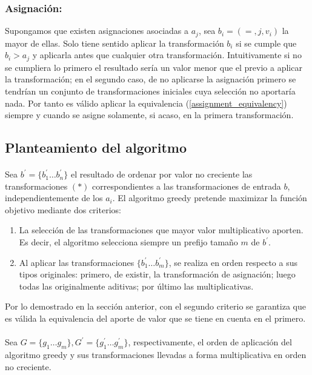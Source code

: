 \documentclass{article}
\theoremstyle{default}
\begin{document}
		\subsubsection{Asignación:}
		\label{assignment_equivalency_proof}
		Supongamos que existen asignaciones asociadas a $a_j$, sea $b_i = (=, j, v_i)$ la mayor de ellas. Solo tiene sentido aplicar la transformación $b_i$ si se cumple que $b_i > a_j$ y aplicarla antes que cualquier otra transformación. Intuitivamente si no se cumpliera lo primero el resultado sería un valor menor que el previo a aplicar la transformación; en el segundo caso, de no aplicarse la asignación primero se tendrían un conjunto de transformaciones iniciales cuya selección no aportaría nada. Por tanto es válido aplicar la equivalencia (\ref{assignment_equivalency}) siempre y cuando se asigne solamente, si acaso, en la primera transformación.
%
\subsection{Planteamiento del algoritmo}
\paragraph{}
	Sea $b^\prime = \{b_1^\prime \dots b_n^\prime\}$ el resultado de ordenar por valor no creciente las transformaciones $(*)$ correspondientes a las transformaciones de entrada $b$, independientemente de los $a_i$. El algoritmo greedy pretende maximizar la función objetivo mediante dos criterios:
%
	\begin{enumerate}
		\item La selección de las transformaciones que mayor valor multiplicativo aporten. Es decir, el algoritmo selecciona siempre un prefijo tamaño $m$ de $b^{\prime}$.
		\item Al aplicar las transformaciones $\{b_1^{\prime} \dots b_m^{\prime}\}$, se realiza en orden respecto a sus tipos originales: primero, de existir, la transformación de asignación; luego todas las originalmente aditivas; por último las multiplicativas.
	\end{enumerate}

	Por lo demostrado en la sección anterior, con el segundo criterio se garantiza que es válida la equivalencia del aporte de valor que se tiene en cuenta en el primero.

\paragraph{}
	Sea $G = \{g_1 \dots g_m\}, G^\prime = \{g_1^\prime \dots g_m^\prime\}$, respectivamente, el orden de aplicación del algoritmo greedy y sus transformaciones llevadas a forma multiplicativa en orden no creciente.
\end{document}

